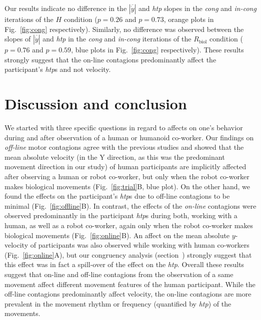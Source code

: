 \documentclass[a4paper, 12pt, oneside]{Thesis}  %
\begin{document}
Our results indicate no difference in the $|\overline{\dot{y}}|$ and {\it htp} slopes in the {\it cong} and {\it in-cong} iterations of the $H$ condition ($p = 0.26$ and $p = 0.73$, orange plots in Fig.~\ref{fig:cong} respectively). Similarly, no difference was observed between the slopes of $|\overline{\dot{y}}|$  and {\it htp} in the {\it cong} and {\it in-cong} iterations of the $R_{\text{biol}}$ condition ($p = 0.76$ and $p = 0.59$, blue plots in Fig.~\ref{fig:cong} respectively). These results strongly suggest that the on-line contagions predominantly affect the participant's {\it htp}s and not velocity.



\clearpage
\section{Discussion and conclusion}

We started with three specific questions in regard to affects on one's behavior during and after observation of a human or humanoid co-worker. Our findings on {\it off-line} motor contagions agree with the previous studies and showed that the mean absolute velocity (in the Y direction, as this was the predominant movement direction in our study) of human participants are implicitly affected after observing a human or robot co-worker, but only when the robot co-worker makes biological movements (Fig.~\ref{fig:trial}B, blue plot). On the other hand, we found the effects on the participant's {\it htp}s due to off-line contagions to be minimal (Fig.~\ref{fig:offline}B). In contrast, the effects of the {\it on-line} contagions were observed predominantly in the participant {\it htp}s during both, working with a human, as well as a robot co-worker, again only when the robot co-worker makes biological movements (Fig.~\ref{fig:online}B). An affect on the mean absolute $y$-velocity of participants was also observed while working with human co-workers (Fig.~\ref{fig:online}A), but our congruency analysis (section~) strongly suggest that this effect was in fact a spill-over of the effect on the {\it htp}.  Overall these results suggest that on-line and off-line contagions from the observation of a same movement affect different movement features of the human participant. While the off-line contagions predominantly affect velocity, the on-line contagions are more prevalent in the movement rhythm or frequency (quantified by {\it htp}) of the movements.
\end{document}

